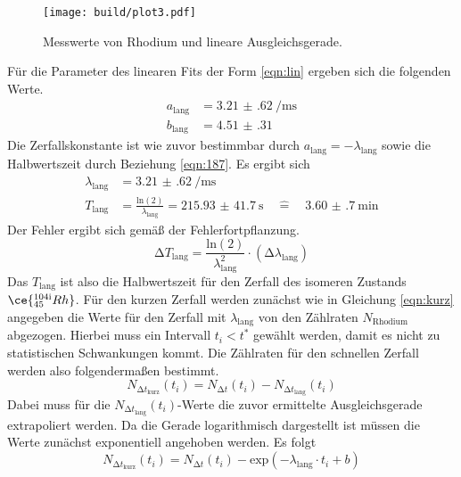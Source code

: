 \begin{figure}[ht!]
  \centering
  \texttt{[image: build/plot3.pdf]}
  \caption{Messwerte von Rhodium und lineare Ausgleichsgerade.}
  \label{fig:plot3}
\end{figure}

Für die Parameter des linearen Fits der Form \eqref{eqn:lin} ergeben sich die folgenden Werte.
\begin{align}
a_{\text{lang}} &= \SI{3.21(62)}{\per\milli\second} \\
b_{\text{lang}} &= \SI{4.51(31)}{}
\end{align}
Die Zerfallskonstante ist wie zuvor bestimmbar durch $a_{\text{lang}} = - \lambda_{\text{lang}}$ sowie die Halbwertszeit durch Beziehung 
\eqref{eqn:187}. Es ergibt sich
\begin{align}
\lambda_{\text{lang}} &= \SI{3.21(62)}{\per\milli\second} \\[1.5pt]
T_{\text{lang}} &= \frac{\text{ln}(2)}{\lambda_{\text{lang}}} = \SI{215.93(4170)}{\second} \quad  \widehat{=} \quad \SI{3.60(70)}{\minute}
\end{align}
Der Fehler ergibt sich gemäß der Fehlerfortpflanzung.
\begin{equation}
\increment T_{\text{lang}} = \frac{\text{ln}(2)}{\lambda_{\text{lang}}^{2}} \cdot (\increment \lambda_{\text{lang}})
\end{equation}
Das $T_{\text{lang}}$ ist also die Halbwertszeit für den Zerfall des isomeren Zustands $\ce{^{104{\text{i}}}_{45}Rh}$.
Für den kurzen Zerfall werden zunächst wie in Gleichung \eqref{eqn:kurz} angegeben die Werte für den Zerfall mit $\lambda_{\text{lang}}$ von den Zählraten $N_{\text{Rhodium}}$ abgezogen. Hierbei muss
ein Intervall $t_{i} < t^{*}$ gewählt werden, damit es nicht zu statistischen Schwankungen kommt.
Die Zählraten für den schnellen Zerfall werden also folgendermaßen bestimmt.
\begin{equation}
\label{eqn:nkurz}
N_{{\increment t}_{\text{kurz}}}(t_{i}) = N_{\increment t}(t_{i}) - N_{{\increment t}_{\text{lang}}}(t_{i})
\end{equation}
Dabei muss für die $N_{{\increment t}_{\text{lang}}}(t_{i})$-Werte die zuvor ermittelte Ausgleichsgerade extrapoliert werden. Da die Gerade logarithmisch dargestellt
ist müssen die Werte zunächst exponentiell angehoben werden. Es folgt
\begin{equation}
N_{{\increment t}_{\text{kurz}}}(t_{i}) = N_{\increment t}(t_{i}) - \text{exp}(-\lambda_{\text{lang}} \cdot t_{i} + b)
\end{equation}
